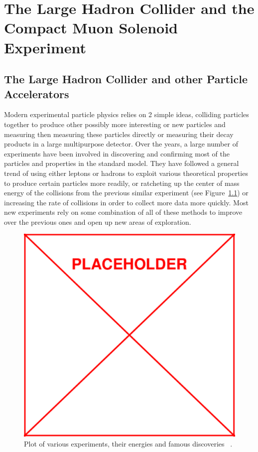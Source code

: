 \chapter{The Large Hadron Collider and the Compact Muon Solenoid Experiment}
\label{ch:LHC}
	\section{The Large Hadron Collider and other Particle Accelerators}
	Modern experimental particle physics relies on 2 simple ideas, colliding particles together to produce other possibly more interesting or new particles and measuring then measuring these particles directly or measuring their decay products in a large multipurpose detector. Over the years, a large number of experiments have been involved in discovering and confirming most of the particles and properties in the standard model. They have followed a general trend of using either leptons or hadrons to exploit various theoretical properties to produce certain particles more readily, or ratcheting up the center of mass energy of the collisions from the previous similar experiment (see Figure~\ref{fig:experiment_energies}) or increasing the rate of collisions in order to collect more data more quickly. Most new experiments rely on some combination of all of these methods to improve over the previous ones and open up new areas of exploration.\\
	
		\begin{figure}[h]
\begin{center}
\includegraphics[width=0.48\linewidth]{Figs/placeholder.pdf}
\caption{\label{fig:experiment_energies}
Plot of various experiments, their energies and famous discoveries ~\cite{}.
}
\end{center}
\end{figure} 
	
